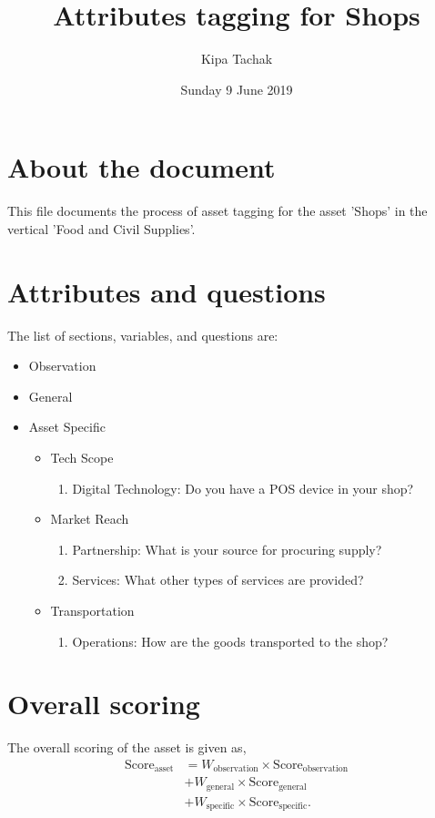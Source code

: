 \documentclass[oneside,twocolumn]{article}
\title{Attributes tagging for Shops}
\author{Kipa Tachak}
\date{Sunday  9 June 2019}
\newcommand{\tsub}[2]{\text{#1}_{\text{#2}}}
\newcommand{\tsubb}[2]{#1_{\text{#2}}}
\begin{document}
\maketitle

\section{About the document}
This file documents the process of asset tagging for the asset 'Shops' in the
vertical 'Food and Civil Supplies'.

\section{Attributes and questions}
The list of sections, variables, and questions are:
    \begin{itemize}
    \item Observation
    \item General
    \item Asset Specific
    \begin{itemize}
\item Tech Scope
\begin{enumerate}
\item Digital Technology: Do you have a POS device in your shop?
\end{enumerate}

\item Market Reach
\begin{enumerate}
\item Partnership: What is your source for procuring supply?
\item Services: What other types of services are provided?
\end{enumerate}

\item Transportation
\begin{enumerate}
\item Operations: How are the goods transported to the shop?
\end{enumerate}

\end{itemize}

    \end{itemize}
\section{Overall scoring}
The overall scoring of the asset is given as,
\begin{align*}
	\tsub{Score}{asset} &= \tsubb{W}{observation} \times \tsub{Score}{observation} \\
	&+ \tsubb{W}{general} \times \tsub{Score}{general} \\
	&+ \tsubb{W}{specific} \times \tsub{Score}{specific}.
\end{align*}
\end{document}
